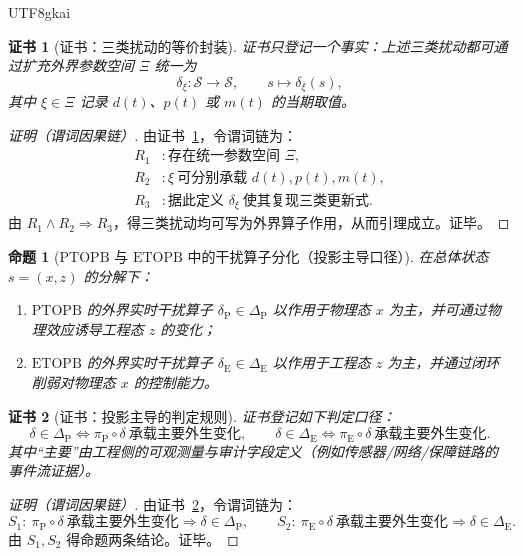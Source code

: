 \documentclass[12pt]{article}
\newtheorem{proposition}{命题}[section]
\newtheorem{Certificate}{证书}[section]
\newcommand{\PTOPB}{\ensuremath{\mathrm{PTOPB}}}
\newcommand{\ETOPB}{\ensuremath{\mathrm{ETOPB}}}
\begin{document}
\begin{CJK*}{UTF8}{gkai}
\begin{Certificate}[证书：三类扰动的等价封装]
\label{cert:disturbance-unified-representation}
证书只登记一个事实：上述三类扰动都可通过扩充外界参数空间 $\Xi$ 统一为
\[
  \delta_{\xi}:\mathcal{S}\to\mathcal{S},\qquad
  s\mapsto \delta_{\xi}(s),
\]
其中 $\xi\in\Xi$ 记录 $d(t)$、$p(t)$ 或 $m(t)$ 的当期取值。
\end{Certificate}

\begin{proof}[证明（谓词因果链）]
由证书~\ref{cert:disturbance-unified-representation}，令谓词链为：
\[
\begin{aligned}
  R_1 &: \text{存在统一参数空间 }\Xi,\\
  R_2 &: \xi\ \text{可分别承载 }d(t),p(t),m(t),\\
  R_3 &: \text{据此定义 }\delta_{\xi}\ \text{使其复现三类更新式}.
\end{aligned}
\]
由 $R_1\wedge R_2\Rightarrow R_3$，得三类扰动均可写为外界算子作用，从而引理成立。证毕。
\end{proof}

\begin{proposition}[\PTOPB{} 与 \ETOPB{} 中的干扰算子分化（投影主导口径）]
\label{prop:disturbance-ptopb-etopb}
在总体状态 $s=(x,z)$ 的分解下：
\begin{enumerate}
  \item \PTOPB{} 的外界实时干扰算子 $\delta_{\mathrm{P}}\in\Delta_{\mathrm{P}}$ 以作用于物理态 $x$ 为主，并可通过物理效应诱导工程态 $z$ 的变化；
  \item \ETOPB{} 的外界实时干扰算子 $\delta_{\mathrm{E}}\in\Delta_{\mathrm{E}}$ 以作用于工程态 $z$ 为主，并通过闭环削弱对物理态 $x$ 的控制能力。
\end{enumerate}
\end{proposition}

\begin{Certificate}[证书：投影主导的判定规则]
\label{cert:disturbance-ptopb-etopb}
证书登记如下判定口径：
\[
  \delta\in\Delta_{\mathrm{P}}
  \Longleftrightarrow
  \pi_{\mathrm{P}}\circ \delta\ \text{承载主要外生变化},
  \qquad
  \delta\in\Delta_{\mathrm{E}}
  \Longleftrightarrow
  \pi_{\mathrm{E}}\circ \delta\ \text{承载主要外生变化}.
\]
其中“主要”由工程侧的可观测量与审计字段定义（例如传感器/网络/保障链路的事件流证据）。
\end{Certificate}

\begin{proof}[证明（谓词因果链）]
由证书~\ref{cert:disturbance-ptopb-etopb}，令谓词链为：
\[
  S_1:\ \pi_{\mathrm{P}}\circ\delta\ \text{承载主要外生变化}\Rightarrow \delta\in\Delta_{\mathrm{P}},
  \qquad
  S_2:\ \pi_{\mathrm{E}}\circ\delta\ \text{承载主要外生变化}\Rightarrow \delta\in\Delta_{\mathrm{E}}.
\]
由 $S_1,S_2$ 得命题两条结论。证毕。
\end{proof}


\end{CJK*}
\end{document}
